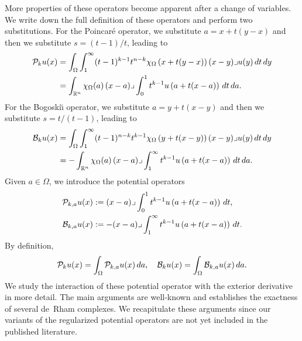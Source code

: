 \documentclass[10pt,a4paper]{article}
\begin{document}
More properties of these operators become apparent after a change of variables. 
We write down the full definition of these operators and perform two substitutions.
For the Poincar\'e operator, we substitute $a = x + t(y-x)$ and then we substitute $s = (t-1)/t$,
leading to 
\begin{align*}
    {\mathcal P}_{k} u(x) 
    &= 
    \int_{\Omega} \int_{1}^\infty (t-1)^{k-1}t^{n-k} 
    \chi_{\Omega}\left(x+t(y-x)\right) 
    (x-y)\lrcorner u(y) \,dt\,dy 
    \\
    &=
    \int_{{\mathbb R}^{n}} \chi_{\Omega}(a) \,(x-a)\lrcorner \int_{0}^{1} t^{k-1} u\left(a+t(x-a)\right)\,dt\,da
    .
\end{align*}
For the Bogoski\u{\i} operator, we substitute $a = y + t(x-y)$ and then we substitute $s = t/(t-1)$,
leading to 
\begin{align*}
    {\mathcal B}_{k} u(x) 
    &= 
    \int_{\Omega} \int_{1}^\infty (t-1)^{n-k}t^{k-1} 
    \chi_{\Omega}\left(y+t(x-y)\right) 
    (x-y)\lrcorner u(y) \,dt\,dy 
    \\
    &=
    - \int_{{\mathbb R}^{n}} \chi_{\Omega}(a) \,(x-a)\lrcorner \int_{1}^\infty t^{k-1} u\left(a+t(x-a)\right)\,dt\,da
    .
\end{align*}
% 
Given $a \in \Omega$, we introduce the potential operators 
\begin{align*}
    {\mathcal P}_{k,a} u(x) 
    &:= 
    (x-a)\lrcorner \int_{0}^{1} t^{k-1} u\left(a+t(x-a)\right)\,dt
    ,
    \\
    {\mathcal B}_{k,a} u(x) 
    &:= 
    - (x-a)\lrcorner \int_{1}^\infty t^{k-1} u\left(a+t(x-a)\right)\,dt
    .
\end{align*}
By definition,
\begin{align*}
    {\mathcal P}_{k} u(x) 
    =
    \int_{\Omega} {\mathcal P}_{k,a} u(x) \,da,
    \quad 
    {\mathcal B}_{k} u(x) 
    =
    \int_{\Omega} {\mathcal B}_{k,a} u(x) \,da
    .
\end{align*}
We study the interaction of these potential operator with the exterior derivative in more detail.
% 
The main arguments are well-known and establishes the exactness of several de~Rham complexes. 
We recapitulate these arguments since our variants of the regularized potential operators are not yet included in the published literature. 
\end{document}
